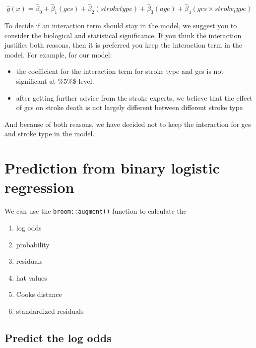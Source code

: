 \documentclass[
  10pt,
]{krantz}
\providecommand{\tightlist}{%
  \setlength{\itemsep}{0pt}\setlength{\parskip}{0pt}}
\begin{document}
\[\hat{g}(x)  = \hat\beta_0 + \hat\beta_1(gcs) + \hat\beta_2(stroke type) + \hat\beta_3(age)+ \hat\beta_4(gcs \times stroke_type)\]

To decide if an interaction term should stay in the model, we suggest you to consider the biological and statistical significance. If you think the interaction justifies both reasons, then it is preferred you keep the interaction term in the model. For example, for our model:

\begin{itemize}
\tightlist
\item
  the coefficient for the interaction term for stroke type and gcs is not significant at \%5\%\$ level.
\item
  after getting further advice from the stroke experts, we believe that the effect of gcs on stroke death is not largely different between different stroke type
\end{itemize}

And because of both reasons, we have decided not to keep the interaction for gcs and stroke type in the model.

\hypertarget{prediction-from-binary-logistic-regression}{%
\section{Prediction from binary logistic regression}\label{prediction-from-binary-logistic-regression}}

We can use the \texttt{broom::augment()} function to calculate the

\begin{enumerate}
\def\labelenumi{\arabic{enumi}.}
\tightlist
\item
  log odds
\item
  probability
\item
  residuals
\item
  hat values
\item
  Cooks distance
\item
  standardized residuals
\end{enumerate}

\hypertarget{predict-the-log-odds}{%
\subsection{\texorpdfstring{Predict the log odds}{Predict the log odds}}\label{predict-the-log-odds}}
\end{document}
